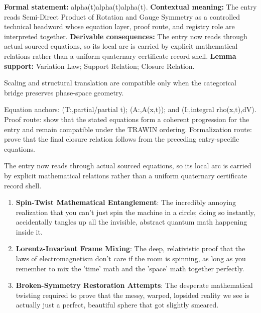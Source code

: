 \begingroup\footnotesize\setlength{\emergencystretch}{3em}\sloppy
\textbf{Formal statement:} alpha(t)alpha(t)alpha(t). \textbf{Contextual meaning:} The entry reads Semi-Direct Product of Rotation and Gauge Symmetry as a controlled technical headword whose equation layer, proof route, and registry role are interpreted together. \textbf{Derivable consequences:} The entry now reads through actual sourced equations, so its local arc is carried by explicit mathematical relations rather than a uniform quaternary certificate record shell. \textbf{Lemma support:} Variation Law; Support Relation; Closure Relation.\par
\endgroup

Scaling and structural translation are compatible only when the categorical bridge preserves phase-space geometry.

Equation anchors: (T:,partial/partial t); (A:,A(x,t)); and (I:,integral rho(x,t),dV). Proof route: show that the stated equations form a coherent progression for the entry and remain compatible under the TRAWIN ordering. Formalization route: prove that the final closure relation follows from the preceding entry-specific equations.

The entry now reads through actual sourced equations, so its local arc is carried by explicit mathematical relations rather than a uniform quaternary certificate record shell.
\endgroup

\begin{enumerate}[leftmargin=1.6em,itemsep=6pt,topsep=4pt]
\item \textbf{Spin-Twist Mathematical Entanglement}: The incredibly annoying realization that you can't just spin the machine in a circle; doing so instantly, accidentally tangles up all the invisible, abstract quantum math happening inside it.
\item \textbf{Lorentz-Invariant Frame Mixing}: The deep, relativistic proof that the laws of electromagnetism don't care if the room is spinning, as long as you remember to mix the 'time' math and the 'space' math together perfectly.
\item \textbf{Broken-Symmetry Restoration Attempts}: The desperate mathematical twisting required to prove that the messy, warped, lopsided reality we see is actually just a perfect, beautiful sphere that got slightly smeared.
\end{enumerate}

